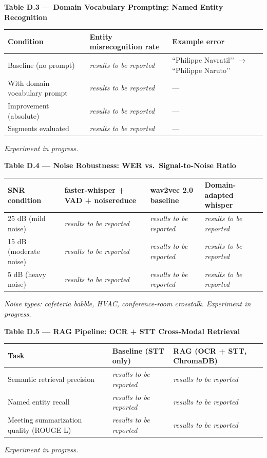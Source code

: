 \documentclass[12pt,a4paper]{article}
\begin{document}
\bigskip
\noindent\textbf{Table D.3 --- Domain Vocabulary Prompting: Named Entity Recognition}

\begin{center}
\begin{tabular}{|l|l|l|}
\hline
\textbf{Condition} & \textbf{Entity misrecognition rate} & \textbf{Example error} \\
\hline
Baseline (no prompt) & \textit{results to be reported} & ``Philippe Navratil’’ $\to$ ``Philippe Naruto’’ \\
With domain vocabulary prompt & \textit{results to be reported} & --- \\
Improvement (absolute) & \textit{results to be reported} & --- \\
Segments evaluated & \textit{results to be reported} & --- \\
\hline
\end{tabular}
\end{center}
\textit{Experiment in progress.}

\bigskip
\noindent\textbf{Table D.4 --- Noise Robustness: WER vs.\ Signal-to-Noise Ratio}

\begin{center}
\begin{tabular}{|l|l|l|l|}
\hline
\textbf{SNR condition} & \textbf{faster-whisper + VAD + noisereduce} & \textbf{wav2vec 2.0 baseline} & \textbf{Domain-adapted whisper} \\
\hline
25 dB (mild noise) & \textit{results to be reported} & \textit{results to be reported} & \textit{results to be reported} \\
15 dB (moderate noise) & \textit{results to be reported} & \textit{results to be reported} & \textit{results to be reported} \\
5 dB (heavy noise) & \textit{results to be reported} & \textit{results to be reported} & \textit{results to be reported} \\
\hline
\end{tabular}
\end{center}
\textit{Noise types: cafeteria babble, HVAC, conference-room crosstalk. Experiment in progress.}

\bigskip
\noindent\textbf{Table D.5 --- RAG Pipeline: OCR + STT Cross-Modal Retrieval}

\begin{center}
\begin{tabular}{|l|l|l|}
\hline
\textbf{Task} & \textbf{Baseline (STT only)} & \textbf{RAG (OCR + STT, ChromaDB)} \\
\hline
Semantic retrieval precision & \textit{results to be reported} & \textit{results to be reported} \\
Named entity recall & \textit{results to be reported} & \textit{results to be reported} \\
Meeting summarization quality (ROUGE-L) & \textit{results to be reported} & \textit{results to be reported} \\
\hline
\end{tabular}
\end{center}
\textit{Experiment in progress.}
\end{document}
